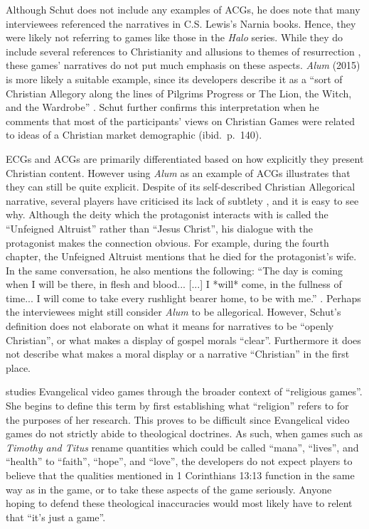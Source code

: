 Although Schut does not include any examples of \acp{ACG}, he does note that many interviewees referenced the narratives in C.S. Lewis's Narnia books. Hence, they were likely not referring to games like those in the \textit{Halo} series. While they do include several references to Christianity and allusions to themes of resurrection \parencite{paulissen_dark_2018}, these games' narratives do not put much emphasis on these aspects. \textit{Alum} (2015) is more likely a suitable example, since its developers describe it as a ``sort of Christian Allegory along the lines of Pilgrims Progress or The Lion, the Witch, and the Wardrobe'' \parencite{crashable_studios_alum_2015}. Schut further confirms this interpretation when he comments that most of the participants' views on Christian Games were related to ideas of a Christian market demographic (ibid.~p.~140).


\acp{ECG} and \acp{ACG} are primarily differentiated based on how explicitly they present Christian content. However using \textit{Alum} as an example of \acp{ACG} illustrates that they can still be quite explicit. Despite of its self-described Christian Allegorical narrative, several players have criticised its lack of subtlety \parencite {arkane_review_2015, baxted_review_2015, virotti_review_2017}, and it is easy to see why. Although the deity which the protagonist interacts with is called the ``Unfeigned Altruist'' rather than ``Jesus Christ'', his dialogue with the protagonist makes the connection obvious. For example, during the fourth chapter, the Unfeigned Altruist mentions that he died for the protagonist's wife. In the same conversation, he also mentions the following: ``The day is coming when I will be there, in flesh and blood... [...] I *will* come, in the fullness of time... I will come to take every rushlight bearer home, to be with me.'' \parencite[10:04]{123pazu_alum_2015}. Perhaps the interviewees might still consider \textit{Alum} to be allegorical. However, Schut's definition does not elaborate on what it means for narratives to be ``openly Christian'', or what makes a display of gospel morals ``clear''. Furthermore it does not describe what makes a moral display or a narrative ``Christian'' in the first place.

\textcite{gonzalez_born-again_2014} studies Evangelical video games through the broader context of ``religious games''. She begins to define this term by first establishing what ``religion'' refers to for the purposes of her research. This proves to be difficult since Evangelical video games do not strictly abide to theological doctrines. As such, when games such as \textit{Timothy and Titus} rename quantities which could be called ``mana'', ``lives'', and ``health'' to ``faith'', ``hope'', and ``love'', the developers do not expect players to believe that the qualities mentioned in 1 Corinthians 13:13 function in the same way as in the game, or to take these aspects of the game seriously. Anyone hoping to defend these theological inaccuracies would most likely have to relent that ``it's just a game''.

